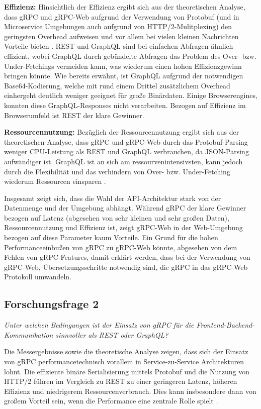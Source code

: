\textbf{Effizienz:} 
Hinsichtlich der Effizienz ergibt sich aus der theoretischen Analyse, dass gRPC und gRPC-Web aufgrund der Verwendung von Protobuf (und in Microservice Umgebungen auch aufgrund von HTTP/2-Mulitplexing) den geringsten Overhead aufweisen und vor allem bei vielen kleinen Nachrichten Vorteile bieten \parencite{Bolanowski2022Efficiency,BergRedi2023Benchmarking}. REST und GraphQL sind bei einfachen Abfragen ähnlich effizient, wobei GraphQL durch gebündelte Abfragen das Problem des Over- bzw. Under-Fetchings vermeiden kann, was wiederum einen hohen Effizienzgewinn bringen könnte. Wie bereits erwähnt, ist GraphQL aufgrund der notwendigen Base64-Kodierung, welche  mit rund einem Drittel zusätzlichem Overhead einhergeht deutlich weniger geeignet für große Binärdaten. Einige Browserengines, konnten diese GraphQL-Responses nicht verarbeiten. Bezogen auf Effizienz im Browserumfeld ist REST der klare Gewinner.

\textbf{Ressourcennutzung:} 
Bezüglich der Ressourcennutzung ergibt sich aus der theoretischen Analyse, dass gRPC und gRPC-Web durch das Protobuf-Parsing weniger CPU-Leistung als REST und GraphQL verbrauchen, da JSON-Parsing aufwändiger ist. GraphQL ist an sich am ressourvenintensivsten, kann jedoch durch die Flexibilität und das verhindern von Over- bzw. Under-Fetching wiederum Ressourcen einsparen \parencite{Niswar2024PerformanceEvaluation}.

Insgesamt zeigt sich, dass die Wahl der API-Architektur stark von der Datenmenge und der Umgebung abhängt. Während gRPC der klare Gewinner bezogen auf Latenz (abgesehen von sehr kleinen und sehr großen Daten), Ressourcennutzung und Effizienz ist, zeigt gRPC-Web in der Web-Umgebung bezogen auf diese Parameter kaum Vorteile. Ein Grund für die hohen Performanceeinbußen von gRPC zu gRPC-Web könnte, abgesehen von dem Fehlen von gRPC-Features, damit erklärt werden, dass bei der Verwendung von gRPC-Web, Übersetzungsschritte notwendig sind, die gRPC in das gRPC-Web Protokoll umwandeln.

\subsection*{Forschungsfrage 2}
\textit{Unter welchen Bedingungen ist der Einsatz von gRPC für die Frontend-Backend-Kommunikation sinnvoller als REST oder GraphQL?}

Die Messergebnisse sowie die theoretische Analyse zeigen, dass sich der Einsatz von gRPC performancetechnisch vorallem in Service-zu-Service Architekturen lohnt. Die effiziente binäre Serialisierung mittels Protobuf und die Nutzung von HTTP/2  führen im Vergleich zu REST zu einer geringeren Latenz, höheren Effizienz und niedrigerem Ressourcenverbrauch. Dies kann insbesondere dann von großem Vorteil sein, wenn die Performance eine zentrale Rolle spielt \parencite{Bolanowski2022Efficiency,BergRedi2023Benchmarking,Niswar2024PerformanceEvaluation}.

